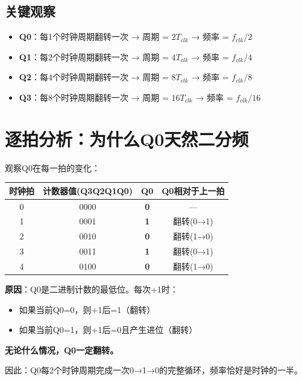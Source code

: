 \subsection{关键观察}

\begin{itemize}
  \item \textbf{Q0}：每1个时钟周期翻转一次 → 周期 = $2T_{clk}$ → 频率 = $f_{clk} / 2$
  \item \textbf{Q1}：每2个时钟周期翻转一次 → 周期 = $4T_{clk}$ → 频率 = $f_{clk} / 4$
  \item \textbf{Q2}：每4个时钟周期翻转一次 → 周期 = $8T_{clk}$ → 频率 = $f_{clk} / 8$
  \item \textbf{Q3}：每8个时钟周期翻转一次 → 周期 = $16T_{clk}$ → 频率 = $f_{clk} / 16$
\end{itemize}

\section{逐拍分析：为什么Q0天然二分频}

\begin{beatanalysis}[Q0为什么二分频]
观察Q0在每一拍的变化：

\begin{center}
\begin{tabular}{|c|c|c|c|}
\hline
\textbf{时钟拍} & \textbf{计数器值(Q3Q2Q1Q0)} & \textbf{Q0} & \textbf{Q0相对于上一拍} \\
\hline
0 & 0000 & \textbf{0} & — \\
1 & 0001 & \textbf{1} & 翻转(0→1) \\
2 & 0010 & \textbf{0} & 翻转(1→0) \\
3 & 0011 & \textbf{1} & 翻转(0→1) \\
4 & 0100 & \textbf{0} & 翻转(1→0) \\
\hline
\end{tabular}
\end{center}
\end{beatanalysis}

\textbf{原因}：Q0是二进制计数的最低位。每次+1时：
\begin{itemize}
  \item 如果当前Q0=0，则+1后=1（翻转）
  \item 如果当前Q0=1，则+1后=0且产生进位（翻转）
\end{itemize}

\textbf{无论什么情况，Q0一定翻转。}

因此：Q0每2个时钟周期完成一次0→1→0的完整循环，频率恰好是时钟的一半。

